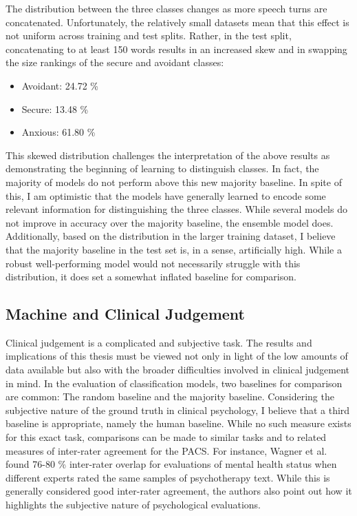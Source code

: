 \documentclass[12pt]{report}
\begin{document}
The distribution between the three classes changes as more speech turns are concatenated.
Unfortunately, the relatively small datasets mean that this effect is not uniform across training and test splits.
Rather, in the test split, concatenating to at least 150 words results in an increased skew and in swapping the size rankings of the secure and avoidant classes:
\begin{itemize}
    \item Avoidant: 24.72 \%
    \item Secure: 13.48 \%
    \item Anxious: 61.80 \%
\end{itemize}

This skewed distribution challenges the interpretation of the above results as demonstrating the beginning of learning to distinguish classes.
In fact, the majority of models do not perform above this new majority baseline.
In spite of this, I am optimistic that the models have generally learned to encode some relevant information for distinguishing the three classes.
While several models do not improve in accuracy over the majority baseline, the ensemble model does.
Additionally, based on the distribution in the larger training dataset, I believe that the majority baseline in the test set is, in a sense, artificially high.
While a robust well-performing model would not necessarily struggle with this distribution, it does set a somewhat inflated baseline for comparison.

\subsection{Machine and Clinical Judgement}
Clinical judgement is a complicated and subjective task.
The results and implications of this thesis must be viewed not only in light of the low amounts of data available but also with the broader difficulties involved in clinical judgement in mind.
In the evaluation of classification models, two baselines for comparison are common: The random baseline and the majority baseline.
Considering the subjective nature of the ground truth in clinical psychology, I believe that a third baseline is appropriate, namely the human baseline.
While no such measure exists for this exact task, comparisons can be made to similar tasks and to related measures of inter-rater agreement for the PACS.
For instance, Wagner et al. \citeyear{Wagner2023} found 76-80 \% inter-rater overlap for evaluations of mental health status when different experts rated the same samples of psychotherapy text.
While this is generally considered good inter-rater agreement, the authors also point out how it highlights the subjective nature of psychological evaluations.
\end{document}
